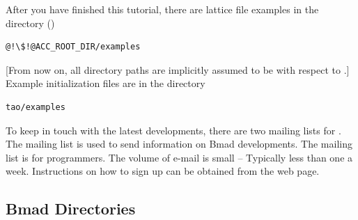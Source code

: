 \documentclass{hitec}     %
\begin{document}
After you have finished this tutorial, there are lattice file examples in the directory
()
\begin{lstlisting}[mathescape]
  @!\$!@ACC_ROOT_DIR/examples
\end{lstlisting}
[From now on, all directory paths are implicitly assumed to be with respect to .]
Example \tao initialization files are in the directory
\begin{lstlisting}[mathescape]
  tao/examples
\end{lstlisting}

To keep in touch with the latest \bmad developments, there are two mailing lists for
\bmad.  The  mailing list is used to send information on Bmad developments.  The
 mailing list is for programmers. The volume of e-mail is small -- Typically
less than one a week. Instructions on how to sign up can be obtained from the \bmad web
page.

\subsection{Bmad Directories}
\label{s:bmad.dir}
\end{document}
